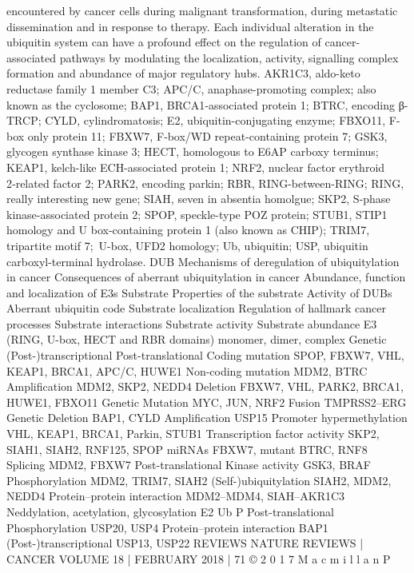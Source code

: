 encountered by cancer cells during malignant transformation, during
metastatic dissemination and in response to therapy. Each individual alteration
in the ubiquitin system can have a profound effect on the regulation of
cancer-associated pathways by modulating the localization, activity, signalling
complex formation and abundance of major regulatory hubs. AKR1C3,
aldo-keto reductase family 1 member C3; APC/C, anaphase-promoting
complex; also known as the cyclosome; BAP1, BRCA1‑associated protein 1;
BTRC, encoding β-TRCP; CYLD, cylindromatosis; E2, ubiquitin-conjugating
enzyme; FBXO11, F-box only protein 11; FBXW7, F‑box/WD repeat-containing
protein 7; GSK3, glycogen synthase kinase 3; HECT, homologous to E6AP
carboxy terminus; KEAP1, kelch-like ECH-associated protein 1; NRF2, nuclear
factor erythroid 2‑related factor 2; PARK2, encoding parkin; RBR,
RING-between-RING; RING, really interesting new gene; SIAH, seven in
absentia homolgue; SKP2, S‑phase kinase-associated protein 2; SPOP,
speckle-type POZ protein; STUB1, STIP1 homology and U box-containing
protein 1 (also known as CHIP); TRIM7, tripartite motif 7; U-box, UFD2
homology; Ub, ubiquitin; USP, ubiquitin carboxyl-terminal hydrolase.
DUB
Mechanisms of deregulation of ubiquitylation in cancer
Consequences of aberrant ubiquitylation in cancer
Abundance, function and
localization of E3s
Substrate
Properties of the substrate
Activity of DUBs
Aberrant ubiquitin code
Substrate localization
Regulation of hallmark cancer processes
Substrate interactions
Substrate activity
Substrate abundance
E3
(RING, U-box, HECT
and RBR domains)
monomer, dimer, complex
Genetic
(Post-)transcriptional
Post-translational
Coding mutation
  SPOP, FBXW7, VHL, KEAP1,
  BRCA1, APC/C, HUWE1
Non-coding mutation
  MDM2, BTRC
Ampliﬁcation
  MDM2, SKP2, NEDD4
Deletion
  FBXW7, VHL, PARK2,
  BRCA1, HUWE1, FBXO11
Genetic
Mutation
  MYC, JUN, NRF2
Fusion
  TMPRSS2–ERG
Genetic
Deletion
  BAP1, CYLD
Ampliﬁcation
  USP15
Promoter hypermethylation
  VHL, KEAP1, BRCA1, Parkin,
  STUB1
Transcription factor activity
  SKP2, SIAH1, SIAH2, RNF125,
  SPOP
miRNAs
  FBXW7, mutant BTRC, RNF8
Splicing
  MDM2, FBXW7
Post-translational
Kinase activity
  GSK3, BRAF
Phosphorylation
  MDM2, TRIM7, SIAH2
(Self-)ubiquitylation
  SIAH2, MDM2, NEDD4
Protein–protein interaction
  MDM2–MDM4, SIAH–AKR1C3
Neddylation, acetylation,
glycosylation
E2
Ub
P
Post-translational
Phosphorylation
  USP20, USP4
Protein–protein interaction
  BAP1
(Post-)transcriptional
USP13, USP22
REVIEWS
NATURE REVIEWS | CANCER
 VOLUME 18 | FEBRUARY 2018 | 71
©
 2
0
1
7
 M
a
c
m
i
l
l
a
n
 P
